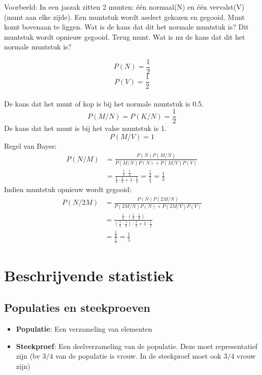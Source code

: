 \documentclass[12pt]{report}
\newcommand{\example}[2]{
      \hrulefill
      
      Voorbeeld: #1
      
      #2
      
      \hrulefill
  }
\begin{document}
\example{In een jaszak zitten 2 munten: één normaal(N) en één vervalst(V) (munt aan elke zijde). Een muntstuk wordt aselect gekozen en gegooid. Munt komt bovenaan te liggen. Wat is de kans dat dit het normale muntstuk is? Dit muntstuk wordt opnieuw gegooid. Terug munt. Wat is nu de kans dat dit het normale muntstuk is?}{
	
	$$P(N) = \frac{1}{2}$$
	$$P(V) = \frac{1}{2}$$
	\\
	De kans dat het munt of kop is bij het normale muntstuk is 0.5.
	$$P(M/N) = P(K/N) = \frac{1}{2}$$
	De kans dat het munt is bij het valse muntstuk is 1.
	$$P(M/V) = 1$$
	Regel van Bayes:
	\begin{equation*}
	 \begin{split}
	  P(N/M) & = \frac{P(N)P(M/N)}{P(M/N)P(N) + P(M/V)P(V)}\\
	         & = \frac{\frac{1}{2} \cdot \frac{1}{2}}{\frac{1}{2} \cdot \frac{1}{2} + 1\cdot \frac{1}{2}}
	          = \frac{\frac{1}{4}}{\frac{3}{4}}
	          = \frac{1}{3}
	 \end{split}
	\end{equation*}
	Indien muntstuk opnieuw wordt gegooid:
	\begin{equation*}
	 \begin{split}
	   P(N/2M) & = \frac{P(N)P(2M/N)}{P(2M/N)P(N) + P(2M/V)P(V)}\\
	           & = \frac{\frac{1}{2} \cdot (\frac{1}{2} \cdot \frac{1}{2})}{(\frac{1}{2} \cdot \frac{1}{2}) \cdot \frac{1}{2} + 1\cdot \frac{1}{2}}\\
	           & = \frac{\frac{1}{4}}{\frac{5}{4}} = \frac{1}{5}
	 \end{split}
	\end{equation*}
}

\chapter{Beschrijvende statistiek}
\section{Populaties en steekproeven}
\begin{itemize}
	\item \textbf{Populatie}: Een verzameling van elementen 
	\item \textbf{Steekproef}: Een deelverzameling van de populatie. Deze moet representatief zijn (bv $3/4$ van de populatie is vrouw. In de steekproef moet ook $3/4$ vrouw zijn)
\end{itemize}
\end{document}
